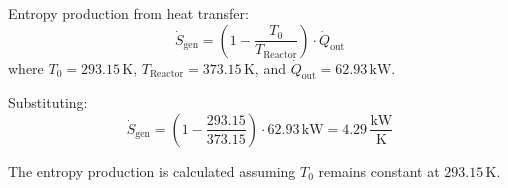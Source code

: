 Entropy production from heat transfer:  
\[
\dot{S}_{\text{gen}} = \left( 1 - \frac{T_0}{T_{\text{Reactor}}} \right) \cdot \dot{Q}_{\text{out}}
\]  
where \( T_0 = 293.15 \, \text{K} \), \( T_{\text{Reactor}} = 373.15 \, \text{K} \), and \( \dot{Q}_{\text{out}} = 62.93 \, \text{kW} \).  

Substituting:  
\[
\dot{S}_{\text{gen}} = \left( 1 - \frac{293.15}{373.15} \right) \cdot 62.93 \, \text{kW} = 4.29 \, \frac{\text{kW}}{\text{K}}
\]  

The entropy production is calculated assuming \( T_0 \) remains constant at \( 293.15 \, \text{K} \).
